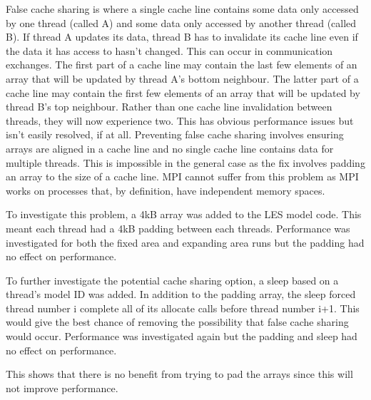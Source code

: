 False cache sharing is where a single cache line contains some data only
accessed by one thread (called A) and some data only accessed by another thread
(called B). If thread A updates its data, thread B has to invalidate its cache
line even if the data it has access to hasn't changed. This can occur in
communication exchanges. The first part of a cache line may contain the last few
elements of an array that will be updated by thread A's bottom neighbour. The
latter part of a cache line may contain the first few elements of an array that
will be updated by thread B's top neighbour. Rather than one cache line
invalidation between threads, they will now experience two. This has obvious
performance issues but isn't easily resolved, if at all. Preventing false cache
sharing involves ensuring arrays are aligned in a cache line and no single cache
line contains data for multiple threads. This is impossible in the general case
as the fix involves padding an array to the size of a cache line. MPI cannot
suffer from this problem as MPI works on processes that, by definition, have
independent memory spaces.

To investigate this problem, a 4kB array was added to the LES model code. This
meant each thread had a 4kB padding between each threads. Performance was
investigated for both the fixed area and expanding area runs but the padding had
no effect on performance.

To further investigate the potential cache sharing option, a sleep based on a
thread's model ID was added. In addition to the padding array, the sleep forced
thread number i complete all of its allocate calls before thread number i+1.
This would give the best chance of removing the possibility that false cache
sharing would occur. Performance was investigated again but the padding and
sleep had no effect on performance.

This shows that there is no benefit from trying to pad the arrays since this
will not improve performance.

